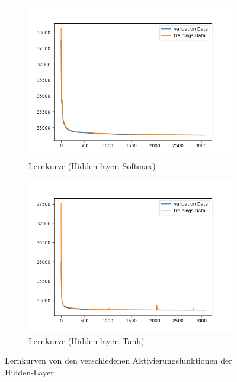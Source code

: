 \begin{figure}[ht]
\centering
\begin{subfigure}{0.5\textwidth}
\centering
\includegraphics[width=\linewidth]{pics/lernkurve_activationHidden-softmax_activationOutput-softmax}
\caption{Lernkurve (Hidden layer: Softmax)}
\label{fig:lernkurveSoftmax}
\end{subfigure}%
\begin{subfigure}{0.5\textwidth}
\centering
\includegraphics[width=\linewidth]{pics/lernkurve_activationHidden-tanh_activationOutput-softmax}
\caption{Lernkurve (Hidden layer: Tanh)}
\label{fig:lernkurveTanh}
\end{subfigure}%
\caption{Lernkurven von den verschiedenen Aktivierungsfunktionen der Hidden-Layer}
\label{fig:lernkurven}
\end{figure}




